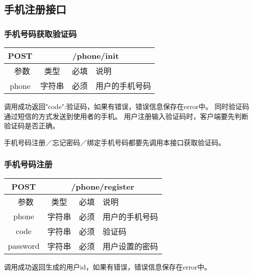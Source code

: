 \subsection{手机注册接口}

\subsubsection{手机号码获取验证码}
\label{hash_algorithm}

\begin{table}[H]
   \begin{center}
\begin{tabular}{|c|c|c|p{12cm}|}
\hline
POST & \multicolumn{3}{|c|}{/phone/init} \\
\hline\hline
 \  参数  & 类型 & 必填 &  说明  \\
\hline
 phone  & 字符串 & 必须 &  用户的手机号码\\
\hline
\end{tabular}
   \end{center}
\end{table}

调用成功返回{"code":验证码}，如果有错误，错误信息保存在error中。
同时验证码通过短信的方式发送到使用者的手机。
用户注册输入验证码时，客户端要先判断验证码是否正确。

手机号码注册／忘记密码／绑定手机号码都要先调用本接口获取验证码。

\subsubsection{手机号码注册}
\label{hash_algorithm}

\begin{table}[H]
   \begin{center}
\begin{tabular}{|c|c|c|p{12cm}|}
\hline
POST & \multicolumn{3}{|c|}{/phone/register} \\
\hline\hline
 \  参数  & 类型 & 必填 &  说明  \\
\hline
 phone  & 字符串 & 必须 &  用户的手机号码\\
\hline
 code  & 字符串 & 必须 &  验证码\\
\hline
 password  & 字符串 & 必须 &  用户设置的密码\\
\hline
\end{tabular}
   \end{center}
\end{table}

调用成功返回生成的用户id，如果有错误，错误信息保存在error中。


